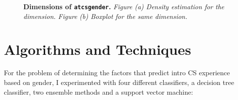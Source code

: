 \begin{figure}[!hbtp]
\centering

    \caption{\textbf{Dimensions of \texttt{atcsgender}.} \textit{Figure (a) Density estimation for the dimension. Figure (b) Boxplot for the same dimension.}}
\end{figure}



\section*{Algorithms and Techniques}

For the problem of determining the factors that predict intro CS experience based on gender, I experimented with four different classifiers, a decision tree classifier, two ensemble methods and a support vector machine:

